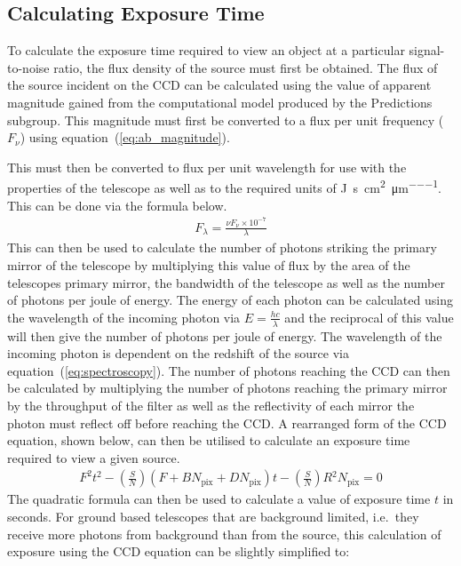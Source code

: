 	\subsection{Calculating Exposure Time} %
	\label{sub:calculating_exposure_time}
		To calculate the exposure time required to view an object at a particular signal-to-noise ratio, the flux density of the source must first be obtained. The flux of the source incident on the CCD can be calculated using the value of apparent magnitude gained from the computational model produced by the Predictions subgroup. This magnitude must first be converted to a flux per unit frequency ($F_\nu$) using equation~(\ref{eq:ab_magnitude}).

		This must then be converted to flux per unit wavelength for use with the properties of the telescope as well as to the required units of \si{\joule\per\second\per\square\centi\metre\per\micro\metre}. This can be done via the formula below. %
		\begin{align}
			F_\lambda = \frac{\nu F_\nu \times 10^{-7}}{\lambda} \label{eq:flux_per_unit_frequency}
		\end{align}
		This can then be used to calculate the number of photons striking the primary mirror of the telescope by multiplying this value of flux by the area of the telescopes primary mirror, the bandwidth of the telescope as well as the number of photons per joule of energy. The energy of each photon can be calculated using the wavelength of the incoming photon via $E = \frac{hc}{\lambda}$ and the reciprocal of this value will then give the number of photons per joule of energy. The wavelength of the incoming photon is dependent on the redshift of the source via equation~(\ref{eq:spectroscopy}). The number of photons reaching the CCD can then be calculated by multiplying the number of photons reaching the primary mirror by the throughput of the filter as well as the reflectivity of each mirror the photon must reflect off before reaching the CCD. A rearranged form of the CCD equation, shown below, can then be utilised to calculate an exposure time required to view a given source.
		\begin{align}
			F^2 t^2 - (\frac{S}{N})(F + BN_\text{pix} + DN_\text{pix})t - (\frac{S}{N})R{^2}N_\text{pix} = 0
		\end{align}
		The quadratic formula can then be used to calculate a value of exposure time $t$ in seconds. For ground based telescopes that are background limited, i.e.\ they receive more photons from background than from the source, this calculation of exposure using the CCD equation can be slightly simplified to:
